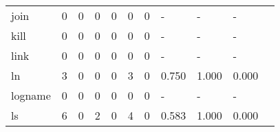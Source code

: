 \begin{longtable}{lp{1.20cm}p{1.20cm}p{1.20cm}p{1.20cm}p{1.20cm}p{1.20cm}p{1.20cm}p{1.20cm}p{1.20cm}p{1.20cm}}
join      &                                     0 &                                                  0 &                                                  0 &                                                  0 &                                                  0 &                                                  0 &                                             - &                                                  - &                                                  - \\
kill      &                                     0 &                                                  0 &                                                  0 &                                                  0 &                                                  0 &                                                  0 &                                             - &                                                  - &                                                  - \\
link      &                                     0 &                                                  0 &                                                  0 &                                                  0 &                                                  0 &                                                  0 &                                             - &                                                  - &                                                  - \\
ln        &                                     3 &                                                  0 &                                                  0 &                                                  0 &                                                  3 &                                                  0 &                                         0.750 &                                              1.000 &                                              0.000 \\
logname   &                                     0 &                                                  0 &                                                  0 &                                                  0 &                                                  0 &                                                  0 &                                             - &                                                  - &                                                  - \\
ls        &                                     6 &                                                  0 &                                                  2 &                                                  0 &                                                  4 &                                                  0 &                                         0.583 &                                              1.000 &                                              0.000 \\

\end{longtable}
